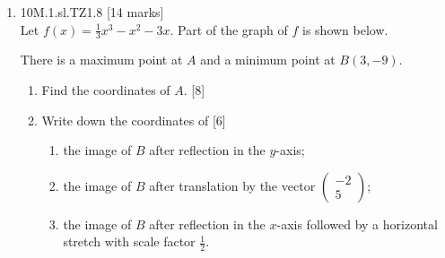 \documentclass[12pt, twoside]{article}
\begin{document}
\begin{enumerate}
  \item 10M.1.sl.TZ1.8 \hfill [14 marks]\\
    Let $f(x)=\frac{1}{3}x^3-x^2-3x$. Part of the graph of $f$ is shown below.
      \begin{center}
      \end{center}
    There is a maximum point at $A$ and a minimum point at $B(3, -9)$.
    \begin{enumerate}
      \item Find the coordinates of $A$. \hfill [8]
      \item Write down the coordinates of \hfill [6]
      \begin{enumerate}
        \item the image of $B$ after reflection in the $y$-axis;
        \item the image of $B$ after translation by the vector $\left( \begin{array}{c} -2 \\ 5 \end{array}\right)$;
        \item the image of $B$ after reflection in the $x$-axis followed by a horizontal stretch with scale factor $\frac{1}{2}$.
      \end{enumerate}
    \end{enumerate}

   \end{enumerate}
\end{document}
